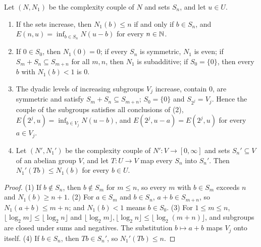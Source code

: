 \begin{lemma}
\label{lem:complexity-couple}
\leanok
{}
Let $(N, N_1)$ be the complexity couple of $N$ and sets $S_n$, and let $u \in U$.
\begin{enumerate}
  \item If the sets increase, then $N_1(b) \leq n$ if and only if $b \in S_n$, and
    $E(n, u) = \inf_{b \in S_n} N(u - b)$ for every $n \in \mathbb{N}$.
  \item If $0 \in S_0$, then $N_1(0) = 0$; if every $S_n$ is symmetric, $N_1$ is even; if
    $S_m + S_n \subseteq S_{m+n}$ for all $m, n$, then $N_1$ is subadditive; if $S_0 = \{0\}$, then
    every $b$ with $N_1(b) < 1$ is $0$.
  \item The dyadic levels of increasing subgroups $V_j$ increase, contain $0$, are symmetric and
    satisfy $S_m + S_n \subseteq S_{m+n}$; $S_0 = \{0\}$ and $S_{2^j} = V_j$. Hence the couple of
    the subgroups satisfies all conclusions of (2), $E(2^j, u) = \inf_{b \in V_j} N(u - b)$, and
    $E(2^j, u - a) = E(2^j, u)$ for every $a \in V_j$.
  \item Let $(N', N_1')$ be the complexity couple of $N' : V \to [0, \infty]$ and sets
    $S_n' \subseteq V$ of an abelian group $V$, and let $T : U \to V$ map every $S_n$ into
    $S_n'$. Then
    $N_1'(Tb) \leq N_1(b)$ for every $b \in U$.
\end{enumerate}
\end{lemma}

\begin{proof}
\leanok
(1) If $b \notin S_n$, then $b \notin S_m$ for $m \leq n$, so every $m$ with $b \in S_m$ exceeds
$n$ and $N_1(b) \geq n + 1$. (2) For $a \in S_m$ and $b \in S_n$, $a + b \in S_{m+n}$, so
$N_1(a + b) \leq m + n$; and $N_1(b) < 1$ means $b \in S_0$. (3) For $1 \leq m \leq n$,
$\lfloor \log_2 m \rfloor \leq \lfloor \log_2 n \rfloor$ and
$\lfloor \log_2 m \rfloor, \lfloor \log_2 n \rfloor \leq \lfloor \log_2 (m + n) \rfloor$, and
subgroups are closed under sums and negatives. The substitution $b \mapsto a + b$ maps $V_j$
onto itself. (4) If $b \in S_n$, then $Tb \in S_n'$, so $N_1'(Tb) \leq n$.
\end{proof}


